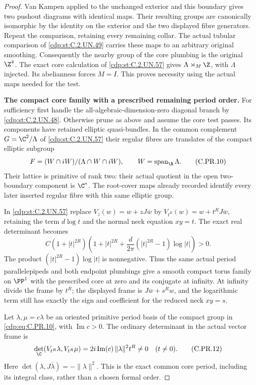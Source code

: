 \begin{proof}
Van Kampen applied to the unchanged exterior and this boundary
gives two pushout diagrams with identical maps. Their resulting
groups are canonically isomorphic by the identity on the exterior
and the two displayed fibre generators. Repeat the comparison,
retaining every remaining collar. The actual tubular comparison
of \ref{cdp:st:C.2.UN.49} carries these maps to an arbitrary original smoothing.
Consequently the nearby group of the core plumbing is the
original $\Z^4$. The exact core calculation of \ref{cdp:st:C.2.UN.57} gives
$\Lambda\rtimes_M\Z$, with $\Lambda$ injected. Its abelianness
forces $M=I$. This proves necessity using the actual maps needed
for the test.

\par\medskip\noindent\textbf{The compact core family with a prescribed remaining period order.}
For sufficiency first handle the all-algebraic-dimension-zero
diagonal branch by \ref{cdp:st:C.2.UN.48}. Otherwise prune as above and assume
the core test passes. Its components have retained elliptic
quasi-bundles. In the common complement
$G=\C^2/\Lambda$ of \ref{cdp:st:C.2.UN.57} their regular fibres are translates
of the compact elliptic subgroup
\[
       F=(W\cap iW)/(\Lambda\cap W\cap iW),
                     \qquad W=\operatorname{span}_{\R}\Lambda.
                                                        \tag{C.PR.10}\label{cdp:eq:C.PR.10}
\]
Their lattice is primitive of rank two: their actual quotient
in the open two-boundary component is $\C^*$.
The root-cover maps already recorded identify every later
inserted regular fibre with this same elliptic group.

In \ref{cdp:st:C.2.UN.57} replace $V_z(w)=w+zJ\overline w$ by
$V_{t^R}(w)=w+t^RJ\overline w$, retaining the term
$d\log t$ and the normal neck equation $xy=t$.
The exact real determinant becomes
\[
 C(1+|t|^{2R})
 \left(1+|t|^{2R}
       +\frac{d}{2\pi}(|t|^{2R}-1)\log|t|\right)>0.
                                                        \tag{C.PR.11}\label{cdp:eq:C.PR.11}
\]
The product $(|t|^{2R}-1)\log|t|$ is nonnegative.
Thus the same actual period parallelepipeds and both endpoint
plumbings give a smooth compact torus family on $\PP^1$ with
the prescribed core at zero and its conjugate at infinity.
At infinity divide the frame by $t^R$; the displayed frame is
$J\overline w+s^Rw$, and the logarithmic term still has exactly
the sign and coefficient for the reduced neck $xy=s$.

Let $\lambda,\mu=c\lambda$ be an oriented primitive period basis
of the compact group in \eqref{cdp:eq:C.PR.10}, with $\operatorname{Im}c>0$.
The ordinary determinant in the actual vector frame is
\[
 \det_{\C}(V_{t^R}\lambda,V_{t^R}\mu)
       =2i\operatorname{Im}(c)\,\|\lambda\|^2 t^R\ne0
                      \quad(t\ne0).                    \tag{C.PR.12}\label{cdp:eq:C.PR.12}
\]
Here $\det(\lambda,J\overline\lambda)=-\|\lambda\|^2$.
This is the exact common core period, including its integral
class, rather than a chosen formal order.


\end{proof}
